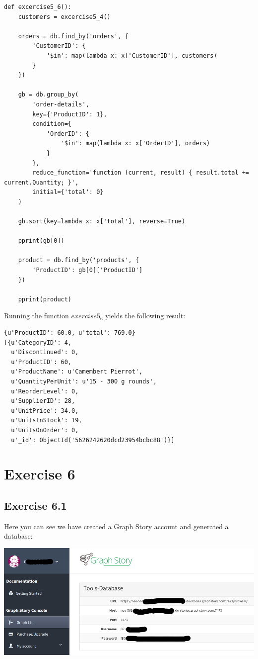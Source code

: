 \documentclass{article}
\begin{document}
\begin{lstlisting}
def excercise5_6():
    customers = excercise5_4()

    orders = db.find_by('orders', {
        'CustomerID': {
            '$in': map(lambda x: x['CustomerID'], customers)
        }
    })

    gb = db.group_by(
        'order-details',
        key={'ProductID': 1},
        condition={
            'OrderID': {
                '$in': map(lambda x: x['OrderID'], orders)
            }
        },
        reduce_function='function (current, result) { result.total += current.Quantity; }',
        initial={'total': 0}
    )

    gb.sort(key=lambda x: x['total'], reverse=True)

    pprint(gb[0])

    product = db.find_by('products', {
        'ProductID': gb[0]['ProductID']
    })

    pprint(product)
\end{lstlisting}

Running the function $exercise5_6$ yields the following result:

\begin{lstlisting}
{u'ProductID': 60.0, u'total': 769.0}
[{u'CategoryID': 4,
  u'Discontinued': 0,
  u'ProductID': 60,
  u'ProductName': u'Camembert Pierrot',
  u'QuantityPerUnit': u'15 - 300 g rounds',
  u'ReorderLevel': 0,
  u'SupplierID': 28,
  u'UnitPrice': 34.0,
  u'UnitsInStock': 19,
  u'UnitsOnOrder': 0,
  u'_id': ObjectId('5626242620dcd23954bcbc88')}]
\end{lstlisting}

\section{Exercise 6}
\label{sec:Exercise 6}

\subsection{Exercise 6.1}
\label{sub:Exercise 6.1}

Here you can see we have created a Graph Story account and generated a database:

\includegraphics[scale=0.45]{graph_story.png}
\end{document}
